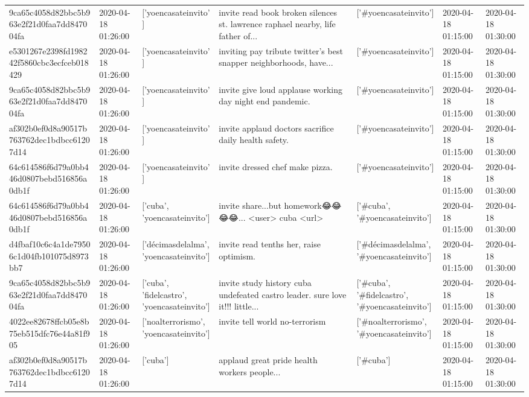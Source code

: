 \begin{tabular}{lllllll}
9ca65c4058d82bbc5b963e2f21d0faa7dd847004fa & 2020-04-18 01:26:00 & ['yoencasateinvito'] & invite read book broken silences st. lawrence raphael nearby, life father of... & ['#yoencasateinvito'] & 2020-04-18 01:15:00 & 2020-04-18 01:30:00 \\
e5301267e2398fd198242f5860cbc3ecfceb018429 & 2020-04-18 01:26:00 & ['yoencasateinvito'] & inviting pay tribute twitter's best snapper neighborhoods, have... & ['#yoencasateinvito'] & 2020-04-18 01:15:00 & 2020-04-18 01:30:00 \\
9ca65c4058d82bbc5b963e2f21d0faa7dd847004fa & 2020-04-18 01:26:00 & ['yoencasateinvito'] & invite give loud applause working day night end pandemic. & ['#yoencasateinvito'] & 2020-04-18 01:15:00 & 2020-04-18 01:30:00 \\
af302b0ef0d8a90517b763762dec1bdbcc61207d14 & 2020-04-18 01:26:00 & ['yoencasateinvito'] & invite applaud doctors sacrifice daily health safety. & ['#yoencasateinvito'] & 2020-04-18 01:15:00 & 2020-04-18 01:30:00 \\
64c614586f6d79a0bb446d0807bebd516856a0db1f & 2020-04-18 01:26:00 & ['yoencasateinvito'] & invite dressed chef make pizza. & ['#yoencasateinvito'] & 2020-04-18 01:15:00 & 2020-04-18 01:30:00 \\
64c614586f6d79a0bb446d0807bebd516856a0db1f & 2020-04-18 01:26:00 & ['cuba', 'yoencasateinvito'] & invite share...but homework😂😂😂😂... <user> cuba <url> & ['#cuba', '#yoencasateinvito'] & 2020-04-18 01:15:00 & 2020-04-18 01:30:00 \\
d4fbaf10c6c4a1de79506c1d04fb101075d8973bb7 & 2020-04-18 01:26:00 & ['décimasdelalma', 'yoencasateinvito'] & invite read tenths her, raise optimism. & ['#décimasdelalma', '#yoencasateinvito'] & 2020-04-18 01:15:00 & 2020-04-18 01:30:00 \\
9ca65c4058d82bbc5b963e2f21d0faa7dd847004fa & 2020-04-18 01:26:00 & ['cuba', 'fidelcastro', 'yoencasateinvito'] & invite study history cuba undefeated castro leader. sure love it!!! little... & ['#cuba', '#fidelcastro', '#yoencasateinvito'] & 2020-04-18 01:15:00 & 2020-04-18 01:30:00 \\
4022ee82678ffcb05e8b75eb515dfc76e44a81f905 & 2020-04-18 01:26:00 & ['noalterrorismo', 'yoencasateinvito'] & invite tell world no-terrorism & ['#noalterrorismo', '#yoencasateinvito'] & 2020-04-18 01:15:00 & 2020-04-18 01:30:00 \\
af302b0ef0d8a90517b763762dec1bdbcc61207d14 & 2020-04-18 01:26:00 & ['cuba'] & applaud great pride health workers people... & ['#cuba'] & 2020-04-18 01:15:00 & 2020-04-18 01:30:00 \\

\end{tabular}
